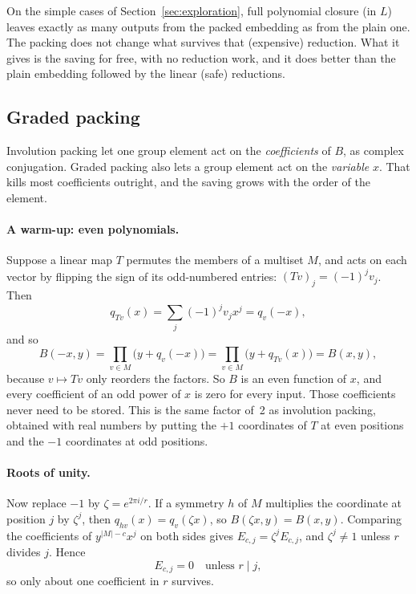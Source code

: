 \documentclass[11pt]{article}
\theoremstyle{definition}
\theoremstyle{remark}
\begin{document}
On the simple cases of Section~\ref{sec:exploration}, full polynomial closure
(in $L$) leaves exactly as many outputs from the packed embedding as from the
plain one. The packing does not change what survives that (expensive)
reduction. What it gives is the saving for free, with no reduction work, and it
does better than the plain embedding followed by the linear (safe) reductions.

\subsection{Graded packing}\label{sec:graded}

Involution packing let one group element act on the \emph{coefficients} of
$B$, as complex conjugation. Graded packing also lets a group element act on the
\emph{variable} $x$. That kills most coefficients outright, and the saving grows
with the order of the element.

\paragraph{A warm-up: even polynomials.}
Suppose a linear map $T$ permutes the members of a multiset $M$, and acts on
each vector by flipping the sign of its odd-numbered entries:
$(Tv)_j = (-1)^j v_j$. Then
\[
  q_{Tv}(x) = \sum_j (-1)^j v_j x^j = q_v(-x),
\]
and so
\[
  B(-x, y) = \prod_{v \in M} \bigl( y + q_v(-x) \bigr)
           = \prod_{v \in M} \bigl( y + q_{Tv}(x) \bigr) = B(x, y),
\]
because $v \mapsto Tv$ only reorders the factors. So $B$ is an even function of
$x$, and every coefficient of an odd power of $x$ is zero for every input.
Those coefficients never need to be stored. This is the same factor of~2 as
involution packing, obtained with real numbers by putting the $+1$ coordinates
of $T$ at even positions and the $-1$ coordinates at odd positions.

\paragraph{Roots of unity.}
Now replace $-1$ by $\zeta = e^{2\pi i/r}$. If a symmetry $h$ of $M$
multiplies the coordinate at position $j$ by $\zeta^j$, then
$q_{hv}(x) = q_v(\zeta x)$, so $B(\zeta x, y) = B(x, y)$. Comparing the
coefficients of $y^{|M|-c} x^j$ on both sides gives
$E_{c,j} = \zeta^j E_{c,j}$, and $\zeta^j \ne 1$ unless $r$ divides $j$.
Hence
\[
  E_{c,j} = 0 \quad \text{unless } r \mid j ,
\]
so only about one coefficient in $r$ survives.
\end{document}
